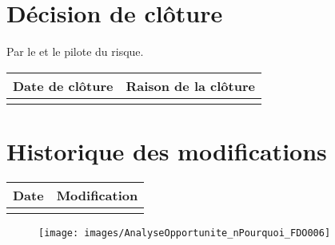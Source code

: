 \section*{Décision de clôture}
Par le \CP{} et le pilote du risque.
\begin{table}[h]
\centering
	\begin{tabularx}{16.8cm}{|X|X|}
	\hline
	Date de clôture & Raison de la clôture \\
	\hline
	  & \\
	\hline
	\end{tabularx}
\end{table}

\section*{Historique des modifications}
\begin{table}[h]
\centering
	\begin{tabularx}{16.8cm}{|X|X|}
	\hline
	Date & Modification \\%
	\hline
	  & \\
	\hline
	\end{tabularx}
\end{table}
\newpage


\begin{figure}
	\centering
	\texttt{[image: images/AnalyseOpportunite\_nPourquoi\_FDO006]}
\end{figure}
